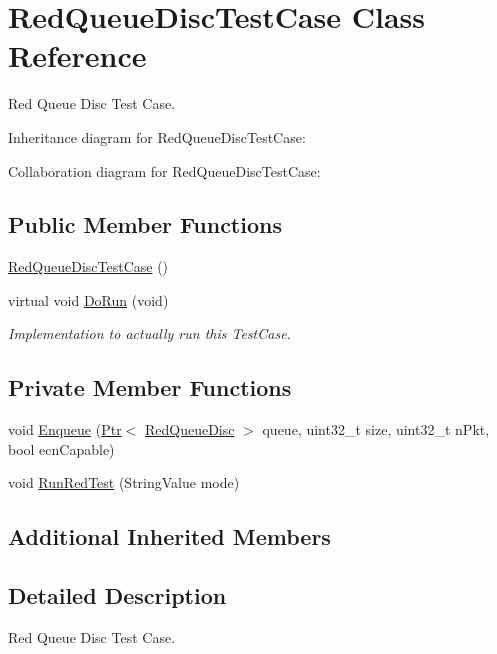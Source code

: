 \hypertarget{classRedQueueDiscTestCase}{}\section{Red\+Queue\+Disc\+Test\+Case Class Reference}
\label{classRedQueueDiscTestCase}


Red Queue Disc Test Case.  




Inheritance diagram for Red\+Queue\+Disc\+Test\+Case\+:


Collaboration diagram for Red\+Queue\+Disc\+Test\+Case\+:
\subsection*{Public Member Functions}
\begin{DoxyCompactItemize}
\item 
\hyperlink{classRedQueueDiscTestCase_a16eaa48b802bf9db9edd207406a8523c}{Red\+Queue\+Disc\+Test\+Case} ()
\item 
virtual void \hyperlink{classRedQueueDiscTestCase_a08dbc0c7061ec2b845ebdfceba6d13dd}{Do\+Run} (void)
\begin{DoxyCompactList}\small\item\em Implementation to actually run this Test\+Case. \end{DoxyCompactList}\end{DoxyCompactItemize}
\subsection*{Private Member Functions}
\begin{DoxyCompactItemize}
\item 
void \hyperlink{classRedQueueDiscTestCase_a231b433374e4485d83bcca3088685e31}{Enqueue} (\hyperlink{classns3_1_1Ptr}{Ptr}$<$ \hyperlink{classns3_1_1RedQueueDisc}{Red\+Queue\+Disc} $>$ queue, uint32\+\_\+t size, uint32\+\_\+t n\+Pkt, bool ecn\+Capable)
\item 
void \hyperlink{classRedQueueDiscTestCase_adde2745516d74c1565a72d1f4e8d0478}{Run\+Red\+Test} (String\+Value mode)
\end{DoxyCompactItemize}
\subsection*{Additional Inherited Members}


\subsection{Detailed Description}
Red Queue Disc Test Case. 

